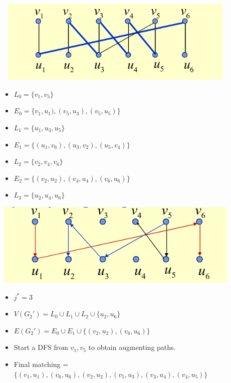 \documentclass[11pt]{beamer}
\theoremstyle{definition}
\begin{document}
\begin{frame}
\includegraphics[width=12cm,height=4cm]{hopstep2}\cite{hopcroft}\\
\begin{multicols}{2}
\begin{itemize}
\item $L_0=\{v_1,v_5\}$
\item $E_0=\{v_1,u_1),(v_5,u_3),(v_5,u_5)\}$
\item $L_1=\{u_1,u_3,u_5\}$
\item $E_1=\{(u_1,v_6),(u_3,v_2),(u_5,v_4)\}$
\item $L_2=\{v_2,v_4,v_6\}$
\item $E_2=\{(v_2,u_2),(v_4,u_4),(v_6,u_6)\}$
\item $L_3=\{u_2,u_4,u_6\}$

\end{itemize}
\end{multicols}
\end{frame}

\begin{frame}
\includegraphics[width=12cm,height=4cm]{hopstep3}\cite{hopcroft}\\
\begin{itemize}
\item $j^*=3$
\item $V(G_2')=L_0 \cup L_1 \cup L_2 \cup \{u_2,u_6\}$
\item $E(G_2')=E_0 \cup E_1 \cup \{(v_2,u_2),(v_6,u_6)\}$
\item Start a DFS from $v_1,v_5$ to obtain augmenting paths.
\item Final matching = $\{(v_1,u_1),(v_6,u_6),(v_2,u_2),(v_5,u_3),(v_3,u_4),(v_4,u_5)\}$
\end{itemize}
\end{frame}
\end{document}
